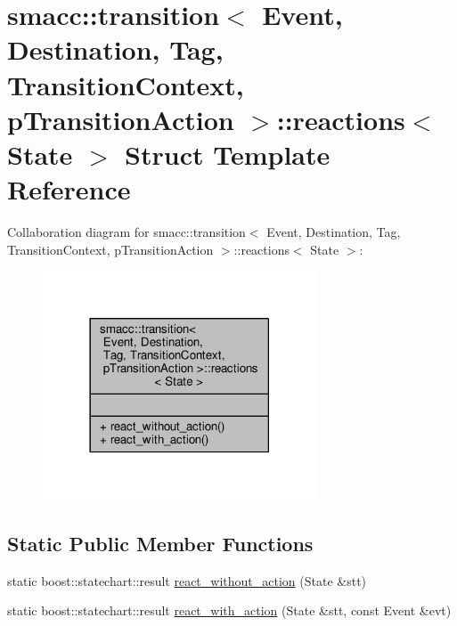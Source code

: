 \hypertarget{structsmacc_1_1transition_1_1reactions}{}\section{smacc\+:\+:transition$<$ Event, Destination, Tag, Transition\+Context, p\+Transition\+Action $>$\+:\+:reactions$<$ State $>$ Struct Template Reference}
\label{structsmacc_1_1transition_1_1reactions}


Collaboration diagram for smacc\+:\+:transition$<$ Event, Destination, Tag, Transition\+Context, p\+Transition\+Action $>$\+:\+:reactions$<$ State $>$\+:
\nopagebreak
\begin{figure}[H]
\begin{center}
\leavevmode
\includegraphics[width=230pt]{structsmacc_1_1transition_1_1reactions__coll__graph}
\end{center}
\end{figure}
\subsection*{Static Public Member Functions}
\begin{DoxyCompactItemize}
\item 
static boost\+::statechart\+::result \hyperlink{structsmacc_1_1transition_1_1reactions_a2298b392deaaae5c0f75aaa6a3713093}{react\+\_\+without\+\_\+action} (State \&stt)
\item 
static boost\+::statechart\+::result \hyperlink{structsmacc_1_1transition_1_1reactions_aae5893338403bed6dfdc3ee3d5bc9c42}{react\+\_\+with\+\_\+action} (State \&stt, const Event \&evt)
\end{DoxyCompactItemize}


